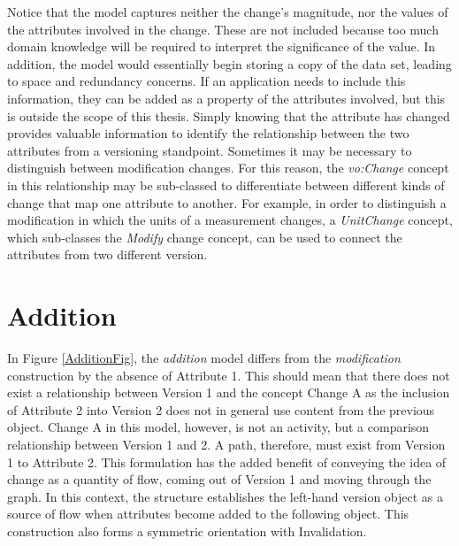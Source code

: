 Notice that the model captures neither the change's magnitude, nor the values of the attributes involved in the change.
These are not included because too much domain knowledge will be required to interpret the significance of the value.
In addition, the model would essentially begin storing a copy of the data set, leading to space and redundancy concerns.
If an application needs to include this information, they can be added as a property of the attributes involved, but this is outside the scope of this thesis.
Simply knowing that the attribute has changed provides valuable information to identify the relationship between the two attributes from a versioning standpoint.
Sometimes it may be necessary to distinguish between modification changes.
For this reason, the \textit{vo:Change} concept in this relationship may be sub-classed to differentiate between different kinds of change that map one attribute to another.
For example, in order to distinguish a modification in which the units of a measurement changes, a \textit{UnitChange} concept, which sub-classes the \textit{Modify} change concept, can be used to connect the attributes from two different version.



\section{Addition}

In Figure \ref{AdditionFig}, the \textit{addition} model differs from the \textit{modification} construction by the absence of Attribute 1.
This should mean that there does not exist a relationship between Version 1 and the concept Change A as the inclusion of Attribute 2 into Version 2 does not in general use content from the previous object.
Change A in this model, however, is not an activity, but a comparison relationship between Version 1 and 2.
A path, therefore, must exist from Version 1 to Attribute 2.
This formulation has the added benefit of conveying the idea of change as a quantity of flow, coming out of Version 1 and moving through the graph.
In this context, the structure establishes the left-hand version object as a source of flow when attributes become added to the following object.
This construction also forms a symmetric orientation with Invalidation.

